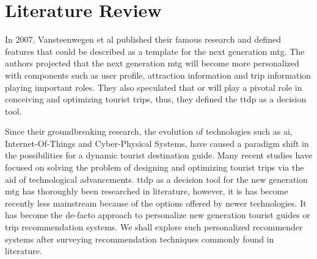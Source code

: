 
\chapter{Literature Review}\label{chapter:literature_review}
In 2007, Vansteenwegen et al published their famous research \parencite{Vansteenwegen2007TheOpportunity} and defined features that could be described as a template for the next generation \gls{mtg}. The authors projected that the next generation \gls{mtg} will become more personalized with components such as user profile, attraction information and trip information playing important roles. They also speculated that \gls{or} will play a pivotal role in conceiving and optimizing tourist trips, thus, they defined the \gls{ttdp} as a decision tool.

Since their groundbreaking research, the evolution of technologies such as \gls{ai}, Internet-Of-Things and Cyber-Physical Systems, have caused a paradigm shift in the possibilities for a dynamic tourist destination guide. Many recent studies have focused on solving the problem of designing and optimizing tourist trips via the aid of technological advancements. \Gls{ttdp} as a decision tool for the new generation \gls{mtg} has thoroughly been researched in literature, however, it is has become recently less mainstream because of the options offered by newer technologies. It has become the de-facto approach to personalize new generation tourist guides or trip recommendation systems. We shall explore such personalized recommender systems after surveying recommendation techniques commonly found in literature.

